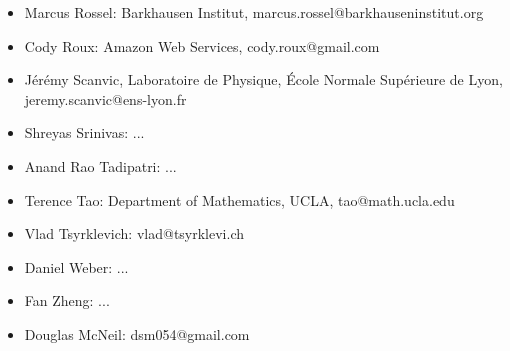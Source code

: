 \begin{itemize}
    \item Marcus Rossel: Barkhausen Institut, marcus.rossel@barkhauseninstitut.org
    \item Cody Roux: Amazon Web Services, cody.roux@gmail.com
    \item J\'er\'emy Scanvic, Laboratoire de Physique, École Normale Supérieure de Lyon, jeremy.scanvic@ens-lyon.fr
    \item Shreyas Srinivas: ...
    \item Anand Rao Tadipatri: ...
    \item Terence Tao: Department of Mathematics, UCLA, tao@math.ucla.edu
    \item Vlad Tsyrklevich: vlad@tsyrklevi.ch
    \item Daniel Weber: ...
    \item Fan Zheng: ...
    \item Douglas McNeil: dsm054@gmail.com
\end{itemize}
